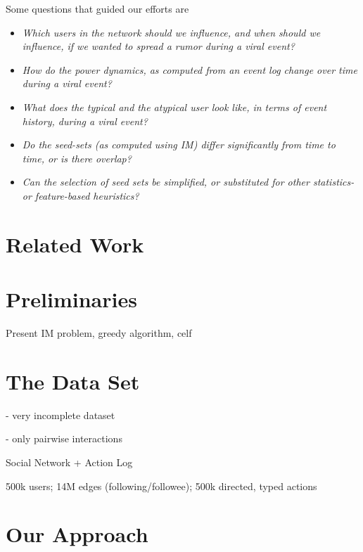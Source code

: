 \documentclass[sigconf]{acmart}
\begin{document}
Some questions that guided our efforts are 
\begin{itemize}
\item \emph{Which users in the network should we influence, and when should we influence, if we wanted to spread a rumor during a viral event?}

\item \emph{How do the power dynamics, as computed from an event log change over time during a viral event?}

\item \emph{What does the typical and the atypical user look like, in terms of event history, during a viral event?}

\item \emph{Do the seed-sets (as computed using IM) differ significantly from time to time, or is there overlap?}

\item \emph{Can the selection of seed sets be simplified, or substituted for other statistics- or feature-based heuristics? }

\end{itemize}

\section{Related Work}



\section{Preliminaries}



Present IM problem, greedy algorithm, celf

\section{The Data Set}



- very incomplete dataset

- only pairwise interactions

Social Network + Action Log

500k users; 14M edges (following/followee); 500k directed, typed actions

\section{Our Approach}
\end{document}
